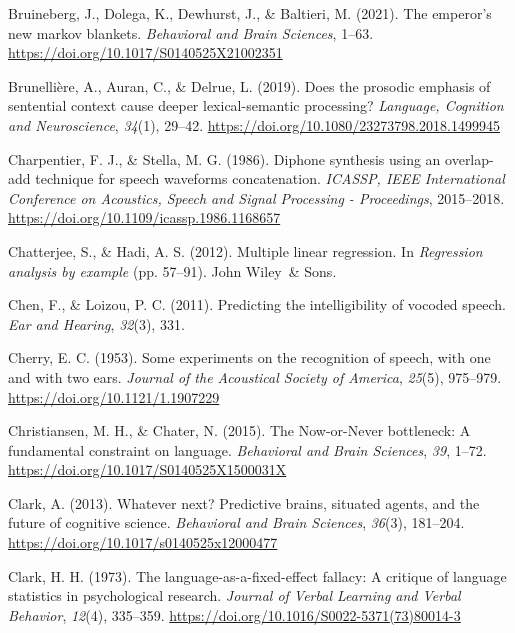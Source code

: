 \documentclass[a4paper, nobind]{templates/ociamthesis}
\newlength{\cslhangindent}
\newenvironment{CSLReferences}[2] %
 {%
  \setlength{\parindent}{0pt}
  \ifodd #1
  \let\oldpar\par
  \def\par{\hangindent=\cslhangindent\oldpar}
  \fi
  \setlength{\parskip}{1mm}
  \setlength{\baselineskip}{6mm}
 }%
 {}
\begin{document}
\begin{CSLReferences}{1}{0}
\leavevmode{}%
Bruineberg, J., Dolega, K., Dewhurst, J., \& Baltieri, M. (2021). The emperor's new markov blankets. \emph{Behavioral and Brain Sciences}, 1--63. \url{https://doi.org/10.1017/S0140525X21002351}

\leavevmode{}%
Brunellière, A., Auran, C., \& Delrue, L. (2019). {Does the prosodic emphasis of sentential context cause deeper lexical-semantic processing?} \emph{Language, Cognition and Neuroscience}, \emph{34}(1), 29--42. \url{https://doi.org/10.1080/23273798.2018.1499945}

\leavevmode{}%
Charpentier, F. J., \& Stella, M. G. (1986). {Diphone synthesis using an overlap-add technique for speech waveforms concatenation.} \emph{ICASSP, IEEE International Conference on Acoustics, Speech and Signal Processing - Proceedings}, 2015--2018. \url{https://doi.org/10.1109/icassp.1986.1168657}

\leavevmode{}%
Chatterjee, S., \& Hadi, A. S. (2012). Multiple linear regression. In \emph{Regression analysis by example} (pp. 57--91). John Wiley~\& Sons.

\leavevmode{}%
Chen, F., \& Loizou, P. C. (2011). Predicting the intelligibility of vocoded speech. \emph{Ear and Hearing}, \emph{32}(3), 331.

\leavevmode{}%
Cherry, E. C. (1953). {Some experiments on the recognition of speech, with one and with two ears}. \emph{Journal of the Acoustical Society of America}, \emph{25}(5), 975--979. \url{https://doi.org/10.1121/1.1907229}

\leavevmode{}%
Christiansen, M. H., \& Chater, N. (2015). {The Now-or-Never bottleneck: A fundamental constraint on language}. \emph{Behavioral and Brain Sciences}, \emph{39}, 1--72. \url{https://doi.org/10.1017/S0140525X1500031X}

\leavevmode{}%
Clark, A. (2013). Whatever next? Predictive brains, situated agents, and the future of cognitive science. \emph{Behavioral and Brain Sciences}, \emph{36}(3), 181--204. \url{https://doi.org/10.1017/s0140525x12000477}

\leavevmode{}%
Clark, H. H. (1973). {The language-as-a-fixed-effect fallacy: A critique of language statistics in psychological research}. \emph{Journal of Verbal Learning and Verbal Behavior}, \emph{12}(4), 335--359. \url{https://doi.org/10.1016/S0022-5371(73)80014-3}


\end{CSLReferences}
\end{document}
